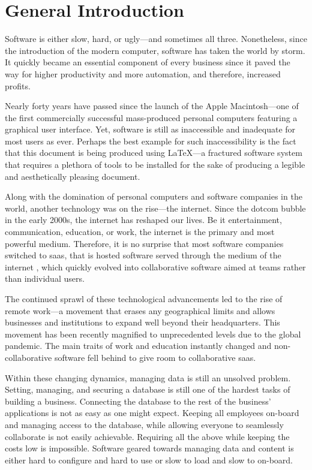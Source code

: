 \chapter*{General Introduction}

Software is either slow, hard, or ugly---and sometimes all three.
Nonetheless, since the introduction of the modern computer, software has taken the world by storm.
It quickly became an essential component of every business since it paved the way for higher productivity and more automation, and therefore, increased profits.

Nearly forty years \parencite{noauthor_macintosh_2010} have passed since the launch of the Apple Macintosh---one of the first commercially successful \parencite{polsson_chronology_2009} mass-produced personal computers featuring a graphical user interface.
Yet, software is still as inaccessible and inadequate for most users as ever.
Perhaps the best example for such inaccessibility is the fact that this document is being produced using \LaTeX---a fractured software system that requires a plethora of tools to be installed for the sake of producing a legible and aesthetically pleasing document.

Along with the domination of personal computers and software companies in the world, another technology was on the rise---the internet. Since the dotcom bubble in the early 2000s, the internet has reshaped our lives.
Be it entertainment, communication, education, or work, the internet is the primary and most powerful medium.
Therefore, it is no surprise that most software companies switched to \acrfull{saas}, that is hosted software served through the medium of the internet \autocite{december_2019_what_nodate}, which quickly evolved into collaborative software aimed at teams rather than individual users.

The continued sprawl of these technological advancements led to the rise of remote work---a movement that erases any geographical limits and allows businesses and institutions to expand well beyond their headquarters. This movement has been recently magnified to unprecedented levels due to the global pandemic. The main traits of work and education instantly changed and non-collaborative software fell behind to give room to collaborative \acrshort{saas}.

Within these changing dynamics, managing data is still an unsolved problem. Setting, managing, and securing a database is still one of the hardest tasks of building a business. Connecting the database to the rest of the business' applications is not as easy as one might expect. Keeping all employees on-board and managing access to the database, while allowing everyone to seamlessly collaborate is not easily achievable. Requiring all the above while keeping the costs low is impossible. Software geared towards managing data and content is either hard to configure and hard to use or slow to load and slow to on-board.

